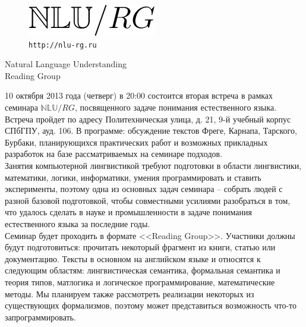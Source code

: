 \documentclass[12pt]{article}
\begin{document}
\baselineskip 24pt

\parindent 0cm

\begin{figure}
  \begin{center}
    \includegraphics[scale=0.70]{nlu-rg-logo.png}\\
    \bigskip
    \texttt{\Large http://nlu-rg.ru}
  \end{center}
\end{figure}

\begin{center}
{\rm \Huge{Natural Language Understanding}}\\
\bigskip
{\rm \Large Reading Group}
\end{center}

\bigskip
\bigskip

\baselineskip 15pt

10 октября 2013 года (четверг) в 20:00 состоится вторая встреча в рамках семинара $\mathbb{NLU}/RG$, посвященного задаче понимания естественного языка. Встреча пройдет по адресу Политехническая улица, д. 21, 9-й учебный корпус СПбГПУ, ауд. 106. В программе: обсуждение текстов Фреге, Карнапа, Тарского, Бурбаки, планирующихся практических работ и возможных прикладных разработок на базе рассматриваемых на семинаре подходов.\\

Занятия компьютерной лингвистикой требуют подготовки в области лингвистики, математики, логики, информатики, умения программировать и ставить эксперименты, поэтому одна из основных задач семинара -- собрать людей с разной базовой подготовкой, чтобы совместными усилиями разобраться в том, что удалось сделать в науке и промышленности в задаче понимания естественного языка за последние годы.\\

Семинар будет проходить в формате <<Reading Group>>. Участники должны будут подготовиться: прочитать некоторый фрагмент из книги, статью или документацию. Тексты в основном на английском языке и относятся к следующим областям: лингвистическая семантика, формальная семантика и теория типов, матлогика и логическое программирование, математические методы. Мы планируем также рассмотреть реализации некоторых из существующих формализмов, поэтому может представиться возможность что-то запрограммировать.\\
\end{document}
